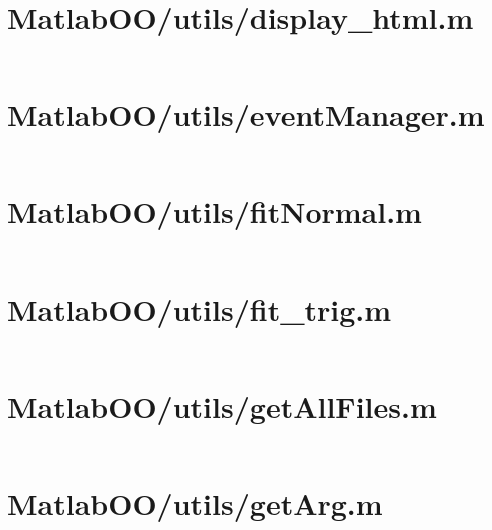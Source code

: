 \pagebreak
\section{MatlabOO/utils/display\_html.m}\label{code:MatlabOO/utils/display_html.m}
\inputminted[linenos,fontsize=\scriptsize]{matlab}{/home/dcouture/git/mathyourlife/TSatPy/beta_versions/matlab_object_oriented/utils/display_html.m}

\pagebreak
\section{MatlabOO/utils/eventManager.m}\label{code:MatlabOO/utils/eventManager.m}
\inputminted[linenos,fontsize=\scriptsize]{matlab}{/home/dcouture/git/mathyourlife/TSatPy/beta_versions/matlab_object_oriented/utils/eventManager.m}

\pagebreak
\section{MatlabOO/utils/fitNormal.m}\label{code:MatlabOO/utils/fitNormal.m}
\inputminted[linenos,fontsize=\scriptsize]{matlab}{/home/dcouture/git/mathyourlife/TSatPy/beta_versions/matlab_object_oriented/utils/fitNormal.m}

\pagebreak
\section{MatlabOO/utils/fit\_trig.m}\label{code:MatlabOO/utils/fit_trig.m}
\inputminted[linenos,fontsize=\scriptsize]{matlab}{/home/dcouture/git/mathyourlife/TSatPy/beta_versions/matlab_object_oriented/utils/fit_trig.m}

\pagebreak
\section{MatlabOO/utils/getAllFiles.m}\label{code:MatlabOO/utils/getAllFiles.m}
\inputminted[linenos,fontsize=\scriptsize]{matlab}{/home/dcouture/git/mathyourlife/TSatPy/beta_versions/matlab_object_oriented/utils/getAllFiles.m}

\pagebreak
\section{MatlabOO/utils/getArg.m}\label{code:MatlabOO/utils/getArg.m}
\inputminted[linenos,fontsize=\scriptsize]{matlab}{/home/dcouture/git/mathyourlife/TSatPy/beta_versions/matlab_object_oriented/utils/getArg.m}

